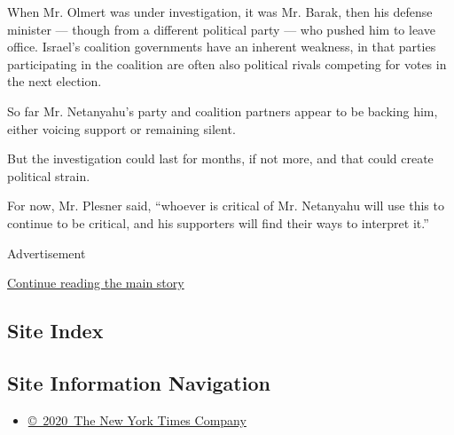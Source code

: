 When Mr. Olmert was under investigation, it was Mr. Barak, then his
defense minister --- though from a different political party --- who
pushed him to leave office. Israel's coalition governments have an
inherent weakness, in that parties participating in the coalition are
often also political rivals competing for votes in the next election.

So far Mr. Netanyahu's party and coalition partners appear to be backing
him, either voicing support or remaining silent.

But the investigation could last for months, if not more, and that could
create political strain.

For now, Mr. Plesner said, ``whoever is critical of Mr. Netanyahu will
use this to continue to be critical, and his supporters will find their
ways to interpret it.''

Advertisement

\protect\hyperlink{after-bottom}{Continue reading the main story}

\hypertarget{site-index}{%
\subsection{Site Index}\label{site-index}}

\hypertarget{site-information-navigation}{%
\subsection{Site Information
Navigation}\label{site-information-navigation}}

\begin{itemize}
\tightlist
\item
  \href{https://help.nytimes3xbfgragh.onion/hc/en-us/articles/115014792127-Copyright-notice}{©~2020~The
  New York Times Company}
\end{itemize}


